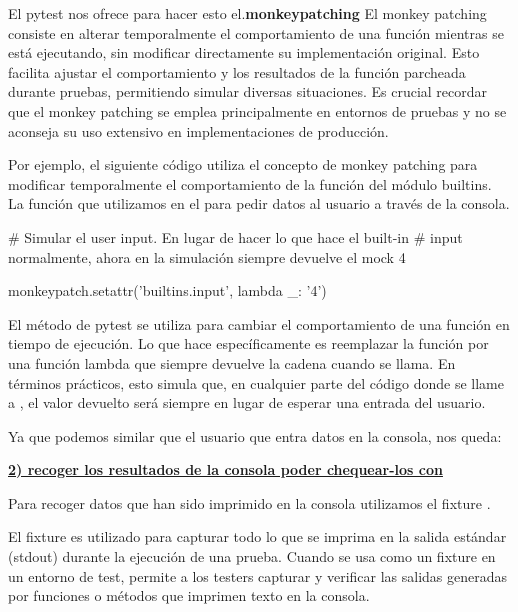El pytest nos ofrece para hacer esto el.\textbf{monkeypatching}
El monkey patching consiste en alterar temporalmente el comportamiento de una función mientras se está ejecutando, sin modificar directamente su implementación original. Esto facilita ajustar el comportamiento y los resultados de la función parcheada durante pruebas, permitiendo simular diversas situaciones. Es crucial recordar que el monkey patching se emplea principalmente en entornos de pruebas y no se aconseja su uso extensivo en implementaciones de producción.

Por ejemplo, el siguiente código utiliza el concepto de monkey patching para modificar temporalmente el comportamiento de la función  del módulo builtins. La función que utilizamos en el  para pedir datos al usuario a través de la consola.

\begin{python}
# Simular el user input. En lugar de hacer lo que hace el built-in
# input normalmente, ahora en la simulación siempre devuelve el mock 4

monkeypatch.setattr('builtins.input', lambda _: '4')
\end{python}

El método  de pytest se utiliza para cambiar el comportamiento de una función en tiempo de ejecución. Lo que hace específicamente es reemplazar la función  por una función lambda que siempre devuelve la cadena  cuando se llama. En términos prácticos, esto simula que, en cualquier parte del código donde se llame a , el valor devuelto será siempre  en lugar de esperar una entrada del usuario.

Ya que podemos similar que el usuario que entra datos en la consola, nos queda:

\underline{\textbf{2) recoger los resultados de la consola poder chequear-los con }}

Para recoger datos que han sido imprimido en la consola utilizamos el fixture .

El fixture  es utilizado para capturar todo lo que se imprima en la salida estándar (stdout) durante la ejecución de una prueba. Cuando se usa  como un fixture en un entorno de test, permite a los testers capturar y verificar las salidas generadas por funciones o métodos que imprimen texto en la consola.

